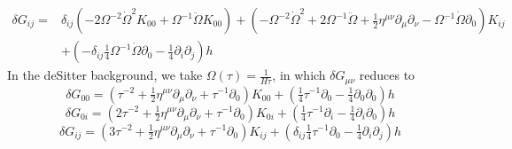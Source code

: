 \documentclass[10pt,letterpaper]{article}
\begin{document}
\begin{align}
\delta G_{ij}={}&
\delta_{ij}(-2 \Omega^{-2} \dot{\Omega}^2 K_{00} + \Omega^{-1} \ddot{\Omega} K_{00}) + (- \Omega^{-2} \dot{\Omega}^2 + 2 \Omega^{-1} \ddot{\Omega} + \tfrac{1}{2} \eta^{\mu \nu} \partial_{\mu} \partial_{\nu} -  \Omega^{-1} \dot{\Omega} \partial_{0}) K_{ij} \nonumber\\
&+ (- \delta_{ij}\tfrac{1}{4} \Omega^{-1} \dot{\Omega} \partial_{0} -  \tfrac{1}{4} \partial_{i} \partial_{j}) h
\end{align}
In the deSitter background, we take $\Omega(\tau) = \frac{1}{H\tau}$, in which $\delta G_{\mu\nu}$ reduces to 
\begin{equation}
\delta G_{00}=
(\tau^{-2} + \tfrac{1}{2} \eta^{\mu \nu} \partial_{\mu} \partial_{\nu} + \tau^{-1} \partial_{0}) K_{00} + (\tfrac{1}{4} \tau^{-1} \partial_{0} -  \tfrac{1}{4} \partial_{0} \partial_{0}) h
\end{equation}
\begin{equation}
\delta G_{0i}=
(2 \tau^{-2} + \tfrac{1}{2} \eta^{\mu \nu} \partial_{\mu} \partial_{\nu} + \tau^{-1} \partial_{0}) K_{0i} + (\tfrac{1}{4} \tau^{-1} \partial_{i} -  \tfrac{1}{4} \partial_{i} \partial_{0}) h
\end{equation}
\begin{equation}
\delta G_{ij}=
(3 \tau^{-2} + \tfrac{1}{2} \eta^{\mu \nu} \partial_{\mu} \partial_{\nu} + \tau^{-1} \partial_{0}) K_{ij} + (\delta_{ij}\tfrac{1}{4} \tau^{-1} \partial_{0} -  \tfrac{1}{4} \partial_{i} \partial_{j}) h
\end{equation}
\\ \\
\end{document}
